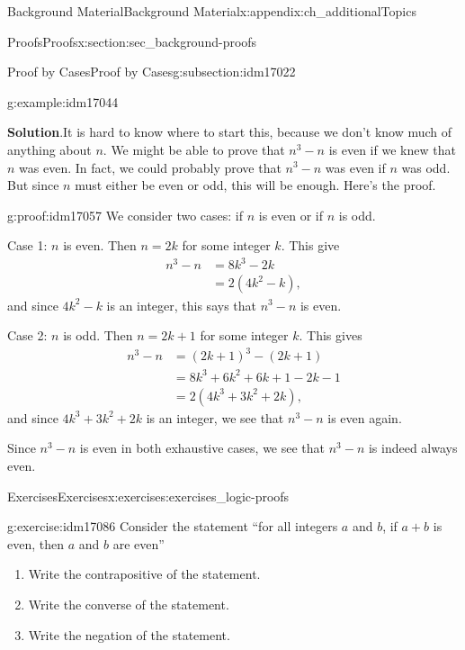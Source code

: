 \documentclass[oneside,10pt,]{book}
\numberwithin{equation}{chapter}
\newcommand{\amp}{&}
\begin{document}
\begin{appendixptx}{Background Material}{}{Background Material}{}{}{x:appendix:ch_additionalTopics}
\begin{sectionptx}{Proofs}{}{Proofs}{}{}{x:section:sec_background-proofs}
\begin{subsectionptx}{Proof by Cases}{}{Proof by Cases}{}{}{g:subsection:idm17022}
\begin{example}{}{g:example:idm17044}
\par\smallskip%
\noindent\textbf{Solution}.\hypertarget{g:solution:idm17049}{}\quad{}It is hard to know where to start this, because we don't know much of anything about \(n\). We might be able to prove that \(n^3 - n\) is even if we knew that \(n\) was even. In fact, we could probably prove that \(n^3-n\) was even if \(n\) was odd. But since \(n\) must either be even or odd, this will be enough. Here's the proof.%
\begin{proofptx}{}{g:proof:idm17057}
We consider two cases: if \(n\) is even or if \(n\) is odd.%
\par
Case 1: \(n\) is even. Then \(n = 2k\) for some integer \(k\). This give%
\begin{align*}
n^3 - n \amp = 8k^3 - 2k\\
\amp = 2(4k^2 - k),
\end{align*}
and since \(4k^2 - k\) is an integer, this says that \(n^3-n\) is even.%
\par
Case 2: \(n\) is odd. Then \(n = 2k+1\) for some integer \(k\). This gives%
\begin{align*}
n^3 - n \amp = (2k+1)^3 - (2k+1)\\
\amp = 8k^3 + 6k^2 + 6k + 1 - 2k - 1\\
\amp = 2(4k^3 + 3k^2 + 2k),
\end{align*}
and since \(4k^3 + 3k^2 + 2k\) is an integer, we see that \(n^3 - n\) is even again.%
\par
Since \(n^3 - n\) is even in both exhaustive cases, we see that \(n^3 - n\) is indeed always even.%
\end{proofptx}
\end{example}
\end{subsectionptx}
%
%
\typeout{************************************************}
\typeout{************************************************}
%
\begin{exercises-subsection}{Exercises}{}{Exercises}{}{}{x:exercises:exercises_logic-proofs}
\begin{divisionexercise}{1}{}{}{g:exercise:idm17086}%
Consider the statement ``for all integers \(a\) and \(b\), if \(a + b\) is even, then \(a\) and \(b\) are even''%
\par
%
\begin{enumerate}[label=(\alph*)]
\item{}Write the contrapositive of the statement.%
\item{}Write the converse of the statement.%
\item{}Write the negation of the statement.%

\end{enumerate}
\end{divisionexercise}
\end{exercises-subsection}
\end{sectionptx}
\end{appendixptx}
\end{document}
